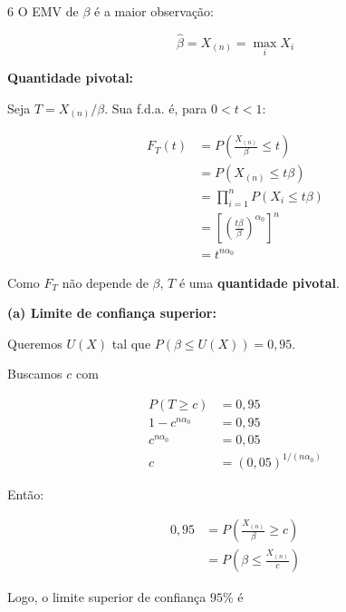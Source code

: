 \documentclass[8pt, a4paper, landscape]{extarticle}
\begin{document}
\begin{multicols}{6}
O EMV de $\beta$ é a maior observação:

\begin{equation*}
\hat{\beta} = X_{(n)} = \max_i X_i
\end{equation*}

\vspace{0.2cm}

\textbf{Quantidade pivotal:}

Seja $T = X_{(n)}/\beta$. Sua f.d.a. é, para $0 < t < 1$:

\begin{equation*}
\begin{split}
F_T(t) &= P\left(\frac{X_{(n)}}{\beta} \leq t\right) \\
&= P(X_{(n)} \leq t\beta) \\
&= \prod_{i=1}^{n} P(X_i \leq t\beta) \\
&= \left[\left(\frac{t\beta}{\beta}\right)^{\alpha_0}\right]^n \\
&= t^{n\alpha_0}
\end{split}
\end{equation*}

Como $F_T$ não depende de $\beta$, $T$ é uma \textbf{quantidade pivotal}.

\vspace{0.2cm}

\textbf{(a) Limite de confiança superior:}

Queremos $U(X)$ tal que $P(\beta \leq U(X)) = 0,95$.

Buscamos $c$ com

\begin{equation*}
\begin{split}
P(T \geq c) &= 0,95 \\
1 - c^{n\alpha_0} &= 0,95 \\
c^{n\alpha_0} &= 0,05 \\
c &= (0,05)^{1/(n\alpha_0)}
\end{split}
\end{equation*}

Então:

\begin{equation*}
\begin{split}
0,95 &= P\left(\frac{X_{(n)}}{\beta} \geq c\right) \\
&= P\left(\beta \leq \frac{X_{(n)}}{c}\right)
\end{split}
\end{equation*}

Logo, o limite superior de confiança $95\%$ é


\end{multicols}
\end{document}
